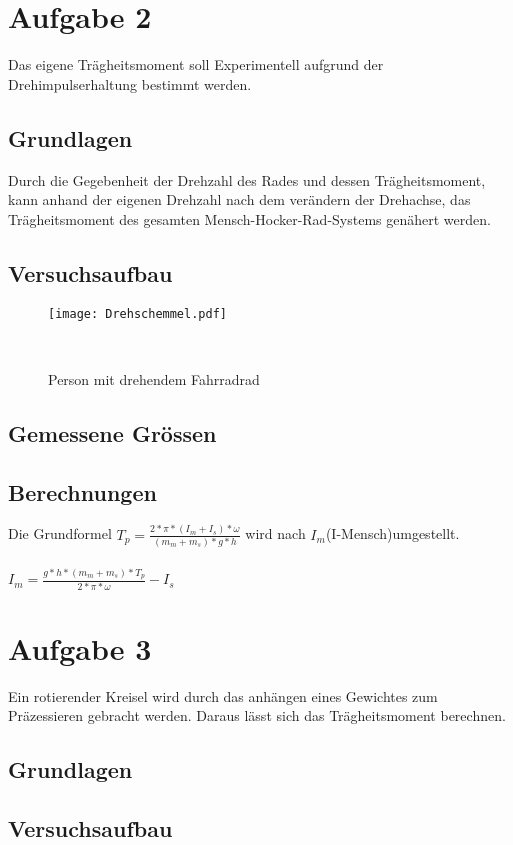\documentclass{article}
\begin{document}
\section{Aufgabe 2}
Das eigene Trägheitsmoment soll Experimentell aufgrund der Drehimpulserhaltung bestimmt werden.

\subsection{Grundlagen}
Durch die Gegebenheit der Drehzahl des Rades und dessen Trägheitsmoment, kann anhand der eigenen
Drehzahl nach dem verändern der Drehachse, das Trägheitsmoment des gesamten 
 Mensch-Hocker-Rad-Systems genähert werden.

\subsection{Versuchsaufbau}
\begin{figure}[h]
\center

\texttt{[image: Drehschemmel.pdf]} 
\caption{Person mit drehendem Fahrradrad}
\
\end{figure}
\subsection{Gemessene Grössen}
\subsection{Berechnungen}
Die Grundformel
$T_p = \frac{2*\pi*(I_m+I_s)*\omega}{(m_m+m_s)*g*h} $ wird nach $I_m$(I-Mensch)umgestellt.\\\\
$I_m = \frac{g*h*(m_m+m_s)*T_p}{2*\pi*\omega}-I_s$




\section{Aufgabe 3}
Ein rotierender Kreisel wird durch das anhängen eines Gewichtes zum Präzessieren gebracht werden. Daraus lässt sich das Trägheitsmoment berechnen. 
\subsection{Grundlagen}
\subsection{Versuchsaufbau}
\end{document}
